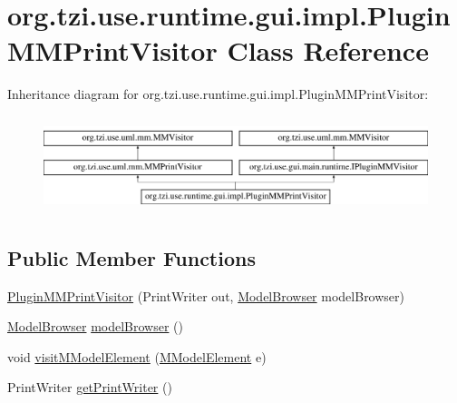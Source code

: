 \hypertarget{classorg_1_1tzi_1_1use_1_1runtime_1_1gui_1_1impl_1_1_plugin_m_m_print_visitor}{\section{org.\-tzi.\-use.\-runtime.\-gui.\-impl.\-Plugin\-M\-M\-Print\-Visitor Class Reference}
\label{classorg_1_1tzi_1_1use_1_1runtime_1_1gui_1_1impl_1_1_plugin_m_m_print_visitor}
}
Inheritance diagram for org.\-tzi.\-use.\-runtime.\-gui.\-impl.\-Plugin\-M\-M\-Print\-Visitor\-:\begin{figure}[H]
\begin{center}
\leavevmode
\includegraphics[height=2.857143cm]{classorg_1_1tzi_1_1use_1_1runtime_1_1gui_1_1impl_1_1_plugin_m_m_print_visitor}
\end{center}
\end{figure}
\subsection*{Public Member Functions}
\begin{DoxyCompactItemize}
\item 
\hyperlink{classorg_1_1tzi_1_1use_1_1runtime_1_1gui_1_1impl_1_1_plugin_m_m_print_visitor_a0f2bdac912a4bc9d53eedcbff1880100}{Plugin\-M\-M\-Print\-Visitor} (Print\-Writer out, \hyperlink{classorg_1_1tzi_1_1use_1_1gui_1_1main_1_1_model_browser}{Model\-Browser} model\-Browser)
\item 
\hyperlink{classorg_1_1tzi_1_1use_1_1gui_1_1main_1_1_model_browser}{Model\-Browser} \hyperlink{classorg_1_1tzi_1_1use_1_1runtime_1_1gui_1_1impl_1_1_plugin_m_m_print_visitor_abaf286cc8760b188b72905c6a9d9a1ec}{model\-Browser} ()
\item 
void \hyperlink{classorg_1_1tzi_1_1use_1_1runtime_1_1gui_1_1impl_1_1_plugin_m_m_print_visitor_a6c1e531e203d855fa92a379039000f5c}{visit\-M\-Model\-Element} (\hyperlink{interfaceorg_1_1tzi_1_1use_1_1uml_1_1mm_1_1_m_model_element}{M\-Model\-Element} e)
\item 
Print\-Writer \hyperlink{classorg_1_1tzi_1_1use_1_1runtime_1_1gui_1_1impl_1_1_plugin_m_m_print_visitor_ac4c917b3f0b57bd906e70f6135ca8719}{get\-Print\-Writer} ()
\end{DoxyCompactItemize}
